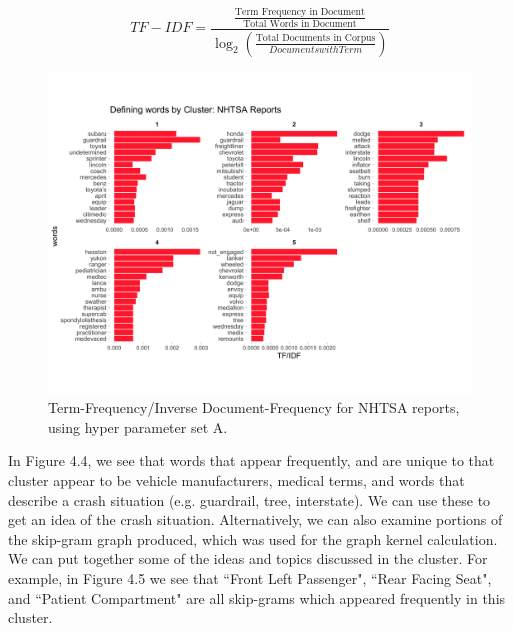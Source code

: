 \begin{equation}
TF-IDF = \frac{\frac{\text{Term Frequency in Document}}{\text{Total Words in Document}}}{\log_2(\frac{\text{Total Documents in Corpus}}{Documents with Term})}
\end{equation}

\newpage

\begin{figure}
\includegraphics[width=6in]{Content/Images/nhtsa_tf_idf.png}
\caption{Term-Frequency/Inverse Document-Frequency for NHTSA reports, using hyper parameter set A.}
\end{figure}

In Figure 4.4, we see that words that appear frequently, and are unique to that cluster appear to be vehicle manufacturers, medical terms, and words that describe a crash situation (e.g. guardrail, tree, interstate). We can use these to get an idea of the crash situation. Alternatively, we can also examine portions of the skip-gram graph produced, which was used for the graph kernel calculation. \\

We can put together some of the ideas and topics discussed in the cluster. For example, in Figure 4.5 we see that ``Front Left Passenger", ``Rear Facing Seat", and ``Patient Compartment" are all skip-grams which appeared frequently in this cluster.\\

